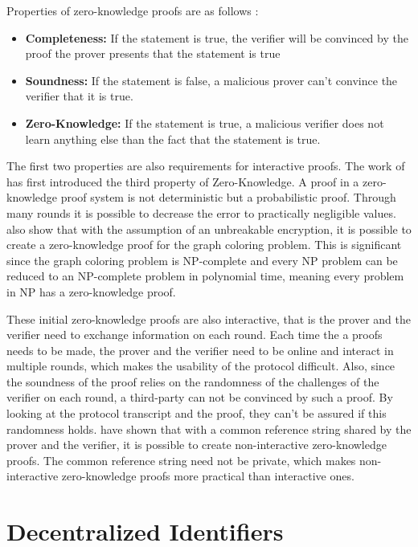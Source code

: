 Properties of zero-knowledge proofs are as follows \parencite{Groth.2010}:
\begin{itemize}
  \item \textbf{Completeness:} If the statement is true, the verifier will be convinced by the proof the prover presents that the statement is true
  \item \textbf{Soundness:} If the statement is false, a malicious prover can't convince the verifier that it is true.
  \item \textbf{Zero-Knowledge:} If the statement is true, a malicious verifier does not learn anything else than the fact that the statement is true.
\end{itemize}

The first two properties are also requirements for interactive proofs. The work of \cite{Goldwasser.1985} has first introduced the third property of Zero-Knowledge. A proof in a zero-knowledge proof system is not deterministic but a probabilistic proof. Through many rounds it is possible to decrease the error to practically negligible values. \cite{Goldreich.1991} also show that with the assumption of an unbreakable encryption, it is possible to create a zero-knowledge proof for the graph coloring problem. This is significant since the graph coloring problem is NP-complete and every NP problem can be reduced to an NP-complete problem in polynomial time, meaning every problem in NP has a zero-knowledge proof. 

These initial zero-knowledge proofs are also interactive, that is the prover and the verifier need to exchange information on each round. Each time the a proofs needs to be made, the prover and the verifier need to be online and interact in multiple rounds, which makes the usability of the protocol difficult. Also, since the soundness of the proof relies on the randomness of the challenges of the verifier on each round, a third-party can not be convinced by such a proof. By looking at the protocol transcript and the proof, they can't be assured if this randomness holds. \cite{Blum.1988} have shown that with a common reference string shared by the prover and the verifier, it is possible to create non-interactive zero-knowledge proofs. The common reference string need not be private, which makes non-interactive zero-knowledge proofs more practical than interactive ones.


\section{Decentralized Identifiers}

